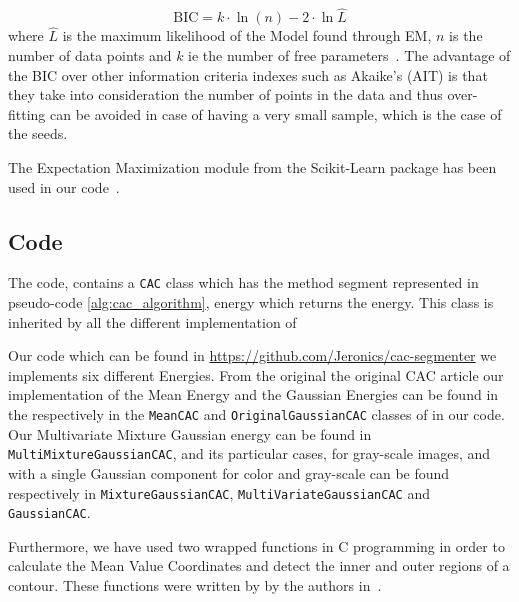 \begin{equation}
	\mathrm{BIC} = {k \cdot \ln(n) -2 \cdot \ln{\hat L}}
\end{equation}
where $\hat L$ is the maximum likelihood of the Model found through EM, $n$ is the number of data points and $k$  ie the number of free parameters~\cite{STAN:STAN530}. The advantage of the BIC over other information criteria indexes such as Akaike's (AIT) is that they take into consideration the number of points in the data and thus over-fitting can be avoided in case of having a very small sample, which is the case of the seeds.

The Expectation Maximization module from the Scikit-Learn package has been used in our code~\cite{scikit-learn}. 

\subsection{Code}
\label{subsec:code}

The code, contains a  \verb|CAC| class which has the method segment represented in pseudo-code \ref{alg:cac_algorithm}, energy which returns the energy. This class is inherited by all the different implementation of 

Our code which can be found in \url{https://github.com/Jeronics/cac-segmenter} we implements six different Energies. From the original the original CAC article\cite{ipcac2015} our implementation of the Mean Energy and the Gaussian Energies can be found in the respectively in the \verb|MeanCAC| and \verb|OriginalGaussianCAC| classes of in our code. Our Multivariate Mixture Gaussian energy can be found in \verb|MultiMixtureGaussianCAC|, and its particular cases, for gray-scale images, and with a single Gaussian component for color and gray-scale can be found respectively in \verb|MixtureGaussianCAC|,  \verb|MultiVariateGaussianCAC| and \verb|GaussianCAC|. 

Furthermore, we have used two wrapped functions in C programming in order to calculate the Mean Value Coordinates and detect the inner and outer regions of a contour. These functions were written by by the authors in~\cite{ipcac2015}.

